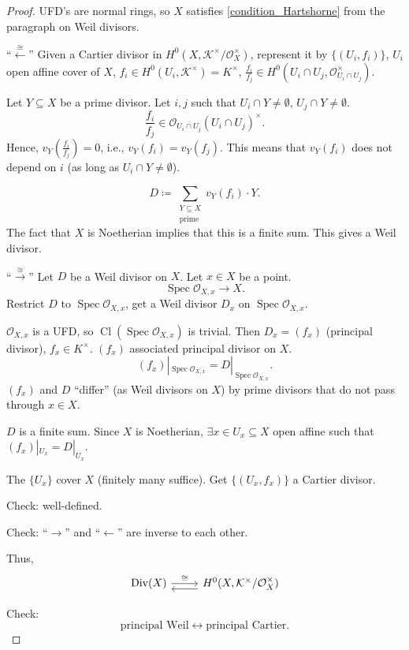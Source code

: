 \documentclass[12pt]{article}
\DeclareMathOperator{\Spec}{Spec}
\DeclareMathOperator{\Div}{Div}
\DeclareMathOperator{\Cl}{Cl}
\theoremstyle{definition}
\begin{document}
\begin{proof}
UFD's are normal rings, so $X$ satisfies \eqref{condition_Hartshorne} from the paragraph on Weil divisors.

``$\xleftarrow\cong$'' Given a Cartier divisor in $H^0(X,\mathcal K^\times/\mathcal O_X^\times)$, represent it by $\{(U_i,f_i)\}$, $U_i$ open affine cover of $X$, $f_i\in H^0(U_i,\mathcal K^\times)=K^\times$, $\frac{f_i}{f_j}\in H^0(U_i\cap U_j,\mathcal O_{U_i\cap U_j}^\times)$.

Let $Y\subseteq X$ be a prime divisor. Let $i,j$ such that $U_i\cap Y\neq\emptyset$, $U_j\cap Y\neq\emptyset$.
\[\frac{f_i}{f_j}\in\mathcal O_{U_i\cap U_j}(U_i\cap U_j)^\times.\]
Hence, $v_Y(\frac{f_i}{f_j})=0$, i.e., $v_Y(f_i)=v_Y(f_j)$. This means that $v_Y(f_i)$ does not depend on $i$ (as long as $U_i\cap Y\neq\emptyset$).

\[D\coloneqq\sum_{\substack{Y\subseteq X\\\text{prime}}}v_Y(f_i)\cdot Y.\]
The fact that $X$ is Noetherian implies that this is a finite sum. This gives a Weil divisor.

``$\xrightarrow\cong$'' Let $D$ be a Weil divisor on $X$. Let $x\in X$ be a point.
\[\Spec\mathcal O_{X,x}\longrightarrow X.\]
Restrict $D$ to $\Spec\mathcal O_{X,x}$, get a Weil divisor $D_x$ on $\Spec\mathcal O_{X,x}$.

$\mathcal O_{X,x}$ is a UFD, so $\Cl(\Spec\mathcal O_{X,x})$ is trivial. Then $D_x=(f_x)$ (principal divisor), $f_x\in K^\times$. $(f_x)$ associated principal divisor on $X$.
\[(f_x)|_{\Spec\mathcal O_{X,x}}=D|_{\Spec\mathcal O_{X,x}}.\]
$(f_x)$ and $D$ ``differ'' (as Weil divisors on $X$) by prime divisors that do not pass through $x\in X$.

$D$ is a finite sum. Since $X$ is Noetherian, $\exists x\in U_x\subseteq X$ open affine such that $(f_x)|_{U_x}=D|_{U_x}$.

The $\{U_x\}$ cover $X$ (finitely many suffice). Get $\{(U_x,f_x)\}$ a Cartier divisor.

Check: well-defined.

Check: ``$\rightarrow$'' and ``$\leftarrow$'' are inverse to each other.

Thus,
\[\begin{tikzcd}\Div(X)\arrow[r,"\cong"]&H^0(X,\mathcal K^\times/\mathcal O_X^\times)\arrow[l,shift left, shift left]\end{tikzcd}\]

Check:
\[\text{principal Weil}\longleftrightarrow\text{principal Cartier}.\]
\end{proof}
\end{document}
